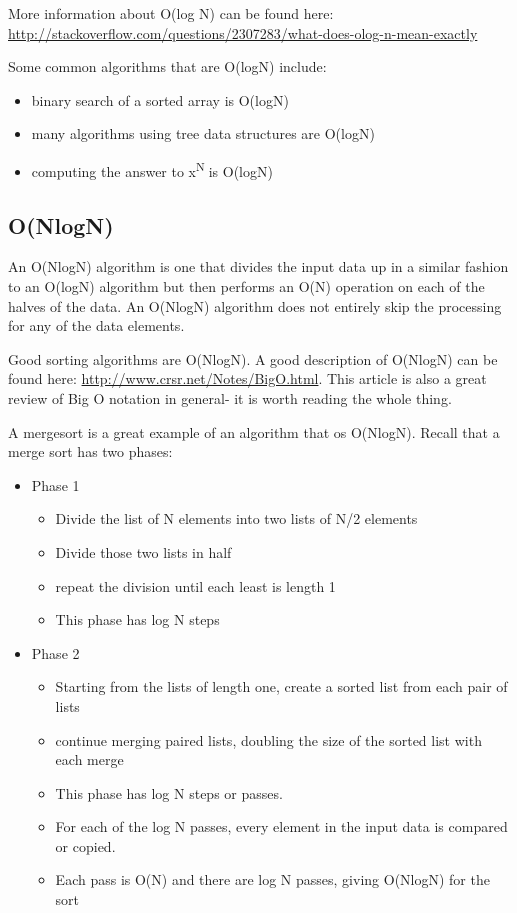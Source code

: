 More information about O(log N) can be found here:
\url{http://stackoverflow.com/questions/2307283/what-does-olog-n-mean-exactly}


Some common algorithms that are O(logN) include:
\begin{itemize}

\item binary search of a sorted array is O(logN)
\item many algorithms using tree data structures are O(logN)
\item  computing the answer to x\textsuperscript{N{ }}is O(logN)
\end{itemize}


\subsection{O(NlogN)}

An O(NlogN) algorithm is one that divides the input data
up in a similar fashion to an O(logN) algorithm but then performs an O(N)
operation on each of the halves of the data.   An O(NlogN) algorithm does not entirely skip the processing for any of the data elements.

Good sorting algorithms are O(NlogN). A good description of O(NlogN) can
be found here: \url{http://www.crsr.net/Notes/BigO.html}. This article
is also a great review of Big O notation in general- it is worth reading the whole
thing.

A mergesort is a great example of an algorithm that os O(NlogN).   Recall that a merge sort has two phases:

\begin{itemize}
\item Phase 1
\begin{itemize}
\item Divide the list of N elements into two lists of N/2 elements
\item Divide those two lists in half
\item repeat the division until each least is length 1
\item This phase has log N steps
\end{itemize}
\item Phase 2
\begin{itemize}
\item Starting from the lists of length one, create a sorted list from each pair of lists
\item continue merging paired lists, doubling the size of the sorted list with each merge
\item This phase has log N steps or passes.   
\item For each of the log N passes,  every element in the input data is compared or copied.   
\item Each pass is O(N) and there are log N passes, giving O(NlogN) for the sort
\end{itemize}
\end{itemize}





